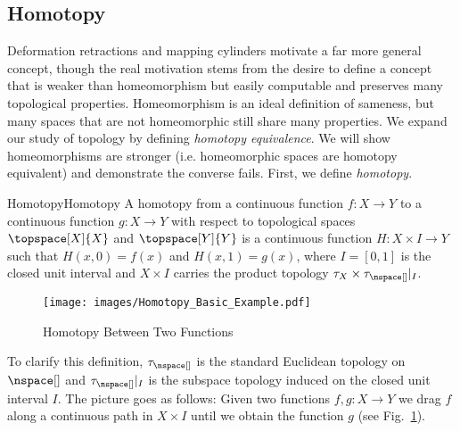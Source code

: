 \documentclass{book}                                                           %
\begin{document}
            \subsection{Homotopy}
                Deformation retractions and mapping cylinders motivate a far
                more general concept, though the real motivation stems from the
                desire to define a concept that is weaker than homeomorphism but
                easily computable and preserves many topological properties.
                Homeomorphism is an ideal definition of sameness, but many
                spaces that are not homeomorphic still share many properties. We
                expand our study of topology by defining
                \textit{homotopy equivalence}. We will show homeomorphisms are
                stronger (i.e. homeomorphic spaces are homotopy equivalent) and
                demonstrate the converse fails. First, we define
                \textit{homotopy}.
                \begin{fdefinition}{Homotopy}{Homotopy}
                    A homotopy from a continuous function $f:X\rightarrow{Y}$ to
                    a continuous function $g:X\rightarrow{Y}$ with respect to
                    topological spaces $\topspace[X]{X}$ and $\topspace[Y]{Y}$
                    is a continuous function $H:{X}\times{I}\rightarrow{Y}$ such
                    that $H(x,0)=f(x)$ and $H(x,1)=g(x)$, where $I=[0,1]$ is the
                    closed unit interval and $X\times{I}$ carries the product
                    topology $\tau_{X}\times\tau_{\nspace[]}|_{I}$.
                \end{fdefinition}
                \begin{figure}[H]
                    \centering
                    \captionsetup{type=figure}
                    \texttt{[image: images/Homotopy\_Basic\_Example.pdf]}
                    \caption{Homotopy Between Two Functions}
                    \label{fig:Homotopy_Diagram_for_Depicting_Homotopy}
                \end{figure}
                To clarify this definition, $\tau_{\nspace[]}$ is the standard
                Euclidean topology on $\nspace[]$ and $\tau_{\nspace[]}|_{I}$
                is the subspace topology induced on the closed unit interval
                $I$. The picture goes as follows: Given two functions
                $f,g:X\rightarrow{Y}$ we drag $f$ along a continuous path in
                $X\times{I}$ until we obtain the function $g$ (see
                Fig.~\ref{fig:Homotopy_Diagram_for_Depicting_Homotopy}).
\end{document}
